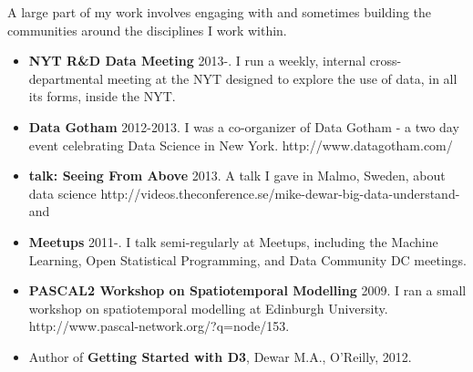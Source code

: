 \documentclass{res}
\begin{document}
\begin{resume}
A large part of my work involves engaging with and sometimes building the communities around the disciplines I work within. 
\begin{itemize}
  \item {\bf NYT R\&D Data Meeting} 2013-. I run a weekly, internal cross-departmental meeting at the NYT designed to explore the use of data, in all its forms, inside the NYT. 
  \item {\bf Data Gotham} 2012-2013. I was a co-organizer of Data Gotham - a two day event celebrating Data Science in New York. http://www.datagotham.com/
  \item {\bf talk: Seeing From Above} 2013. A talk I gave in Malmo, Sweden, about data science http://videos.theconference.se/mike-dewar-big-data-understand-and 
  \item {\bf Meetups} 2011-. I talk semi-regularly at Meetups, including the Machine Learning, Open Statistical Programming, and Data Community DC meetings.
  \item {\bf PASCAL2 Workshop on Spatiotemporal Modelling} 2009. I ran a small workshop on spatiotemporal modelling at Edinburgh University. http://www.pascal-network.org/?q=node/153.
  \item Author of {\bf Getting Started with D3}, Dewar M.A., O'Reilly, 2012.  
\end{itemize}

\end{resume}
\end{document}

